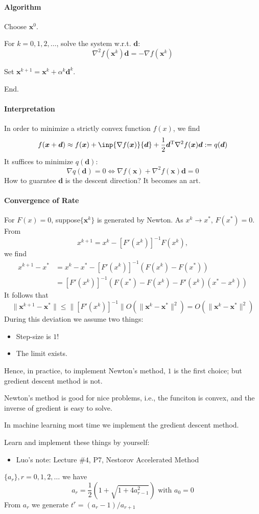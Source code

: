\paragraph{Algorithm} Choose $\bm x^0$.

For $k=0,1,2,\dots$, solve the system w.r.t. $\bm d$:
\[
\nabla^2 f(\bm x^k)\bm d = -\nabla f(\bm x^k)
\]

Set $\bm x^{k+1} = \bm x^k + \alpha^k\bm d^k$.

End.
\paragraph{Interpretation}
In order to minimize a strictly convex function $f(x)$, we find
\[
f(\bm x+\bm d) \approx f(\bm x)+\inp{\nabla f(\bm x)}{\bm d}+\frac{1}{2}\bm d\trans\nabla^2 f(\bm x)\bm d:=q(\bm d)
\]
It suffices to minimize $q(\bm d)$:
\[
\nabla q(\bm d)=0\Longleftrightarrow
\nabla f(\bm x)+\nabla^2f(\bm x)\bm d=0
\]
How to guarntee $\bm d$ is the descent direction? It becomes an art.

\paragraph{Convergence of Rate}
For $F(x)=0$, suppose$\{\bm x^k\}$ is generated by Newton. As $x^k\to x^*$, $F(x^*)=0$. From
\[
x^{k+1} = x^k - [F'(x^k)]^{-1}F(x^k),
\]
we find
\begin{align*}
x^{k+1} - x^* &=  x^k - x^* -  [F'(x^k)]^{-1}\left(F(x^k) - F(x^*)\right)\\
&=[F'(x^k)]^{-1}\left(F(x^*) - F(x^k) - F'(x^k)(x^* - x^k)\right)
\end{align*}
It follows that
\[
\|\bm x^{k+1} - \bm x^*\|\le \|[F'(x^k)]^{-1}\|O(\|\bm x^k - \bm x^*\|^2)
=
O(\|\bm x^k - \bm x^*\|^2)
\]
During this deviation we assume two things:
\begin{itemize}
\item
Step-size is $1$!
\item
The limit exists.
\end{itemize}
Hence, in practice, to implement Newton's method, $1$ is the first choice; but gredient descent method is not.

Newton's method is good for nice problems, i.e., the funciton is convex, and the inverse of gredient is easy to solve.

In machine learning most time we implement the gredient descent method. 

Learn and implement these things by yourself:
\begin{itemize}
\item
Luo's note: Lecture $\#4$, P7, Nestorov Accelerated Method
\end{itemize}
$\{a_r\}, r=0,1,2,\dots$ we have
\[
a_r = \frac{1}{2}(1+\sqrt{1+4a_{r-1}^2})\mbox{ with }a_0=0
\]
From $a_r$ we generate $t^r = (a_{r}-1) / a_{r+1}$
